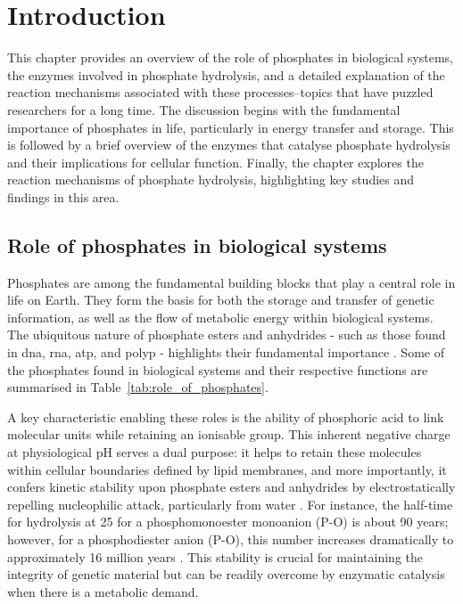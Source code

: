 \chapter{Introduction}
This chapter provides an overview of the role of phosphates in biological systems, the enzymes involved in phosphate hydrolysis, and a detailed explanation of the reaction mechanisms associated with these processes--topics that have puzzled researchers for a long time. The discussion begins with the fundamental importance of phosphates in life, particularly in energy transfer and storage. This is followed by a brief overview of the enzymes that catalyse phosphate hydrolysis and their implications for cellular function. Finally, the chapter explores the reaction mechanisms of phosphate hydrolysis, highlighting key studies and findings in this area.

\section{Role of phosphates in biological systems}
Phosphates are among the fundamental building blocks that play a central role in life on Earth. They form the basis for both the storage and transfer of genetic information, as well as the flow of metabolic energy within biological systems. The ubiquitous nature of phosphate esters and anhydrides - such as those found in \ac{dna}, \ac{rna}, \ac{atp}, and \ac{polyp} - highlights their fundamental importance \citep{westheimerWhyNatureChose1987}. Some of the phosphates found in biological systems and their respective functions are summarised in Table~\ref{tab:role_of_phosphates}.

A key characteristic enabling these roles is the ability of phosphoric acid to link molecular units while retaining an ionisable group. This inherent negative charge at physiological pH serves a dual purpose: it helps to retain these molecules within cellular boundaries defined by lipid membranes, and more importantly, it confers kinetic stability upon phosphate esters and anhydrides by electrostatically repelling nucleophilic attack, particularly from water \citep{westheimerWhyNatureChose1987}. For instance, the half-time for hydrolysis at 25 for a phosphomonoester monoanion (P-O) is about 90 years; however, for a phosphodiester anion (P-O), this number increases dramatically to approximately 16 million years \citep{wolfendenDegreesDifficultyWaterConsuming2006}. This stability is crucial for maintaining the integrity of genetic material but can be readily overcome by enzymatic catalysis when there is a metabolic demand.

